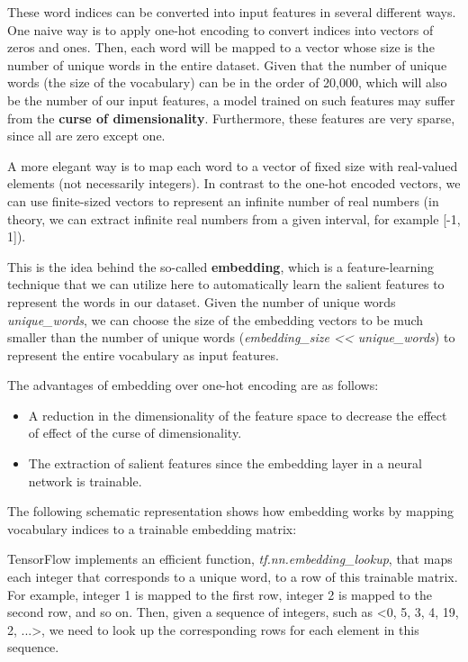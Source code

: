 \documentclass[11pt]{article}
\providecommand{\tightlist}{%
      \setlength{\itemsep}{0pt}\setlength{\parskip}{0pt}}
\begin{document}
These word indices can be converted into input features in several
different ways. One naive way is to apply one-hot encoding to convert
indices into vectors of zeros and ones. Then, each word will be mapped
to a vector whose size is the number of unique words in the entire
dataset. Given that the number of unique words (the size of the
vocabulary) can be in the order of 20,000, which will also be the number
of our input features, a model trained on such features may suffer from
the \textbf{curse of dimensionality}. Furthermore, these features are
very sparse, since all are zero except one.

A more elegant way is to map each word to a vector of fixed size with
real-valued elements (not necessarily integers). In contrast to the
one-hot encoded vectors, we can use finite-sized vectors to represent an
infinite number of real numbers (in theory, we can extract infinite real
numbers from a given interval, for example {[}-1, 1{]}).

This is the idea behind the so-called \textbf{embedding}, which is a
feature-learning technique that we can utilize here to automatically
learn the salient features to represent the words in our dataset. Given
the number of unique words \emph{unique\_words}, we can choose the size
of the embedding vectors to be much smaller than the number of unique
words (\emph{embedding\_size \textless{}\textless{} unique\_words}) to
represent the entire vocabulary as input features.

The advantages of embedding over one-hot encoding are as follows:

\begin{itemize}
\tightlist
\item
  A reduction in the dimensionality of the feature space to decrease the
  effect of effect of the curse of dimensionality.
\item
  The extraction of salient features since the embedding layer in a
  neural network is trainable.
\end{itemize}

The following schematic representation shows how embedding works by
mapping vocabulary indices to a trainable embedding matrix:

    TensorFlow implements an efficient function,
\emph{tf.nn.embedding\_lookup}, that maps each integer that corresponds
to a unique word, to a row of this trainable matrix. For example,
integer 1 is mapped to the first row, integer 2 is mapped to the second
row, and so on. Then, given a sequence of integers, such as
\textless{}0, 5, 3, 4, 19, 2, ...\textgreater{}, we need to look up the
corresponding rows for each element in this sequence.
\end{document}
